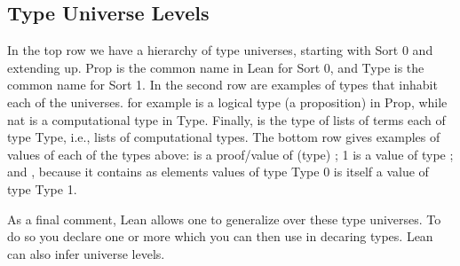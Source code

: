 \documentclass[letterpaper,10pt,english]{sphinxmanual}
\begin{document}
\subsection{Type Universe Levels}
\label{\detokenize{A_02_Constructive_Logic:type-universe-levels}}
\sphinxAtStartPar
In the top row we have a hierarchy of type universes, starting
with Sort 0 and extending up. Prop is the common name in Lean for
Sort 0, and Type is the common name for Sort 1. In the second row
are examples of types that inhabit each of the universes. 
for example is a logical type (a proposition) in Prop, while nat
is a computational type in Type. Finally,  is the type
of lists of terms each of type Type, i.e., lists of computational
types. The bottom row gives examples of values of each of the types
above:  is a proof/value of (type) ; 1 is a value
of type ; and , because it contains as
elements values of type Type 0 is itself a value of type Type 1.

\sphinxAtStartPar
As a final comment, Lean allows one to generalize over these
type universes. To do so you declare one or more  which you can then use in decaring types. Lean can
also infer universe levels.
\end{document}
